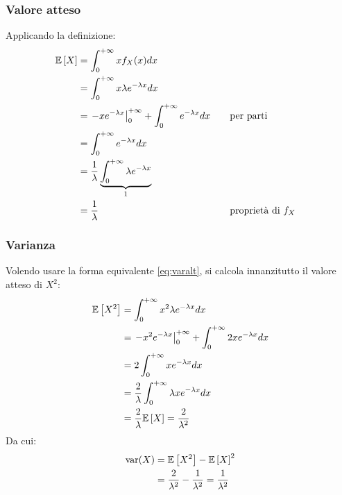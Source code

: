 \subsubsection{Valore atteso}
Applicando la definizione:
\begin{align*}
	\mathbb{E}\left[ X \right] & = \int_0^{+\infty} x f_X(x) dx                                                             \\
	       & = \int_0^{+\infty} x\lambda e^{-\lambda x}dx                                               \\
	       & = \left. -x e^{-\lambda x} \right\rvert_{0}^{+\infty} + \int_0^{+\infty} e^{-\lambda x} dx & \quad & \text{per parti} \\
	       & = \int_0^{+\infty} e^{-\lambda x} dx                                                       \\
	       & = \frac{1}{\lambda} \underbrace{\int_0^{+\infty} \lambda e^{-\lambda x}}_{1}               \\
	       & = \frac{1}{\lambda} & \quad & \text{proprietà di $f_X$}
\end{align*}


\subsubsection{Varianza}
Volendo usare la forma equivalente \eqref{eq:varalt}, si calcola innanzitutto il valore atteso di $X^2$:
\begin{align*}
	\mathbb{E}\left[ X^2 \right] & = \int_0^{+\infty} x^2\lambda e^{-\lambda x} dx                                 \\
	         & = \left. -x^2 e^{-\lambda x} \right\rvert_{0}^{+\infty} + \int_0^{+\infty} 2xe^{-\lambda x} dx \\
	         & = 2\int_0^{+\infty} xe^{-\lambda x}dx                                           \\
	         & = \frac{2}{\lambda} \int_0^{+\infty} \lambda xe^{-\lambda x}dx                  \\
	         & = \frac{2}{\lambda} \mathbb{E}\left[ X \right] = \frac{2}{\lambda^2}
\end{align*}
Da cui:
\begin{align*}
	\operatorname{var}(X) & = \mathbb{E}\left[ X^2 \right] - \mathbb{E}\left[ X \right]^2                                           \\
	        & = \frac{2}{\lambda^2}-\frac{1}{\lambda^2} = \frac{1}{\lambda^2}
\end{align*}


